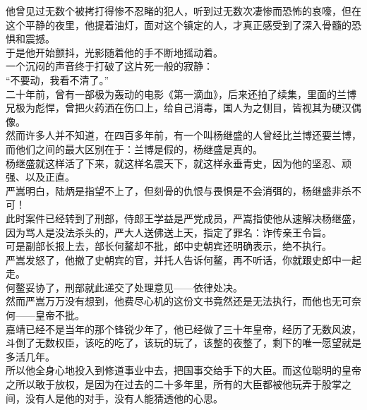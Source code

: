 \begin{multicols}{\theparacolNo}
他曾见过无数个被拷打得惨不忍睹的犯人，听到过无数次凄惨而恐怖的哀嚎，但在这个平静的夜里，他提着油灯，面对这个镇定的人，才真正感受到了深入骨髓的恐惧和震撼。\\

于是他开始颤抖，光影随着他的手不断地摇动着。\\

一个沉闷的声音终于打破了这片死一般的寂静：\\

“不要动，我看不清了。”\\

二十年前，曾有一部极为轰动的电影《第一滴血》，后来还拍了续集，里面的兰博兄极为彪悍，曾把火药洒在伤口上，给自己消毒，国人为之侧目，皆视其为硬汉偶像。\\

然而许多人并不知道，在四百多年前，有一个叫杨继盛的人曾经比兰博还要兰博，而他们之间的最大区别在于：兰博是假的，杨继盛是真的。\\

杨继盛就这样活了下来，就这样名震天下，就这样永垂青史，因为他的坚忍、顽强、以及正直。\\

严嵩明白，陆炳是指望不上了，但刻骨的仇恨与畏惧是不会消弭的，杨继盛非杀不可！\\

此时案件已经转到了刑部，侍郎王学益是严党成员，严嵩指使他从速解决杨继盛，因为骂人是没法杀头的，严大人送佛送上天，指定了罪名：诈传亲王令旨。\\

可是副部长报上去，部长何鳌却不批，郎中史朝宾还明确表示，绝不执行。\\

严嵩发怒了，他撤了史朝宾的官，并托人告诉何鳌，再不听话，你就跟史郎中一起走。\\

何鳌妥协了，刑部就此递交了处理意见——依律处决。\\

然而严嵩万万没有想到，他费尽心机的这份文书竟然还是无法执行，而他也无可奈何——皇帝不批。\\

嘉靖已经不是当年的那个锋锐少年了，他已经做了三十年皇帝，经历了无数风波，斗倒了无数权臣，该吃的吃了，该玩的玩了，该整的夜整了，剩下的唯一愿望就是多活几年。\\

所以他全身心地投入到修道事业中去，把国事交给手下的大臣。而这位聪明的皇帝之所以敢于放权，是因为在过去的二十多年里，所有的大臣都被他玩弄于股掌之间，没有人是他的对手，没有人能猜透他的心思。\\


\end{multicols}
